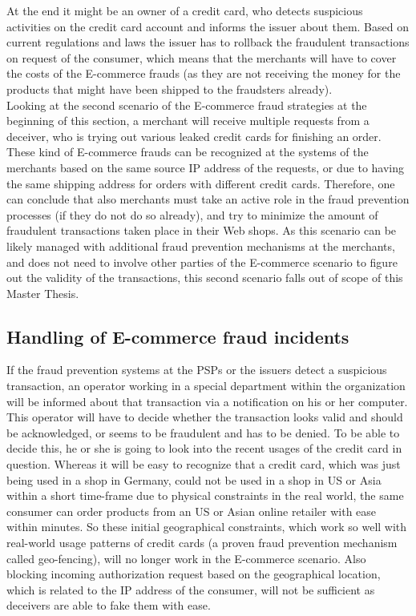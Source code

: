 At the end it might be an owner of a credit card, who detects suspicious activities on the credit card account and informs the issuer about them. Based on current regulations and laws the issuer has to rollback the fraudulent transactions on request of the consumer, which means that the merchants will have to cover the costs of the \gls{E-commerce} frauds (as they are not receiving the money for the products that might have been shipped to the fraudsters already). \\

Looking at the second scenario of the \gls{E-commerce} fraud strategies at the beginning of this section, a merchant will receive multiple requests from a deceiver, who is trying out various leaked credit cards for finishing an order. These kind of \gls{E-commerce} frauds can be recognized at the systems of the merchants based on the same source \gls{IP} address of the requests, or due to having the same shipping address for orders with different credit cards. Therefore, one can conclude that also merchants must take an active role in the fraud prevention processes (if they do not do so already), and try to minimize the amount of fraudulent transactions taken place in their Web shops. As this scenario can be likely managed with additional fraud prevention mechanisms at the merchants, and does not need to involve other parties of the \gls{E-commerce} scenario to figure out the validity of the transactions, this second scenario falls out of scope of this Master Thesis.


\subsection{Handling of \gls{E-commerce} fraud incidents}
\label{subsec:e_commerce_fraud_handling}

If the fraud prevention systems at the \gls{PSP}s or the issuers detect a suspicious transaction, an operator working in a special department within the organization will be informed about that transaction via a notification on his or her computer. This operator will have to decide whether the transaction looks valid and should be acknowledged, or seems to be fraudulent and has to be denied. To be able to decide this, he or she is going to look into the recent usages of the credit card in question. Whereas it will be easy to recognize that a credit card, which was just being used in a shop in Germany, could not be used in a shop in US or Asia within a short time-frame due to physical constraints in the real world, the same consumer can order products from an US or Asian online retailer with ease within minutes. So these initial geographical constraints, which work so well with real-world usage patterns of credit cards (a proven fraud prevention mechanism called geo-fencing), will no longer work in the \gls{E-commerce} scenario. Also blocking incoming authorization request based on the geographical location, which is related to the \gls{IP} address of the consumer, will not be sufficient as deceivers are able to fake them with ease. \\

